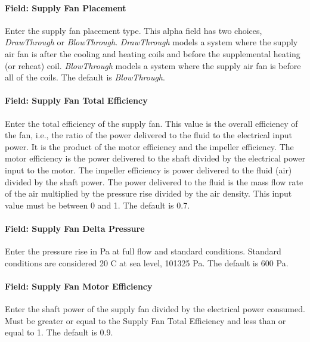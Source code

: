 \paragraph{Field: Supply Fan Placement}\label{field-supply-fan-placement-6}

Enter the supply fan placement type. This alpha field has two choices, \emph{DrawThrough} or \emph{BlowThrough}. \emph{DrawThrough} models a system where the supply air fan is after the cooling and heating coils and before the supplemental heating (or reheat) coil. \emph{BlowThrough} models a system where the supply air fan is before all of the coils. The default is \emph{BlowThrough}.

\paragraph{Field: Supply Fan Total Efficiency}\label{field-supply-fan-total-efficiency-7}

Enter the total efficiency of the supply fan. This value is the overall efficiency of the fan, i.e., the ratio of the power delivered to the fluid to the electrical input power. It is the product of the motor efficiency and the impeller efficiency. The motor efficiency is the power delivered to the shaft divided by the electrical power input to the motor. The impeller efficiency is power delivered to the fluid (air) divided by the shaft power. The power delivered to the fluid is the mass flow rate of the air multiplied by the pressure rise divided by the air density. This input value must be between 0 and 1. The default is 0.7.

\paragraph{Field: Supply Fan Delta Pressure}\label{field-supply-fan-delta-pressure-6}

Enter the pressure rise in Pa at full flow and standard conditions. Standard conditions are considered 20 C at sea level, 101325 Pa. The default is 600 Pa.

\paragraph{Field: Supply Fan Motor Efficiency}\label{field-supply-fan-motor-efficiency-7}

Enter the shaft power of the supply fan divided by the electrical power consumed. Must be greater or equal to the Supply Fan Total Efficiency and less than or equal to 1. The default is 0.9.

